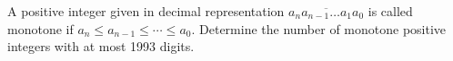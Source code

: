 A positive integer given in decimal representation $\overline{ a_na_{n-1} \ldots a_1a_0 }$ is called monotone if $a_n\leq a_{n-1} \leq \cdots \leq a_0$. Determine the number of monotone positive integers with at most 1993 digits.
